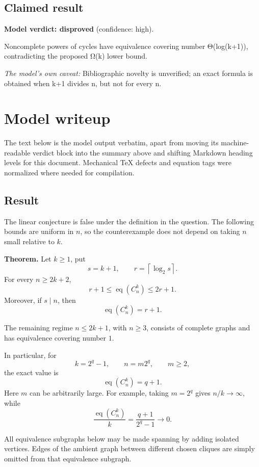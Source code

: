 \documentclass[
  11pt,
  a4paper,
]{article}
\begin{document}
\subsection{Claimed result}\label{claimed-result}

\textbf{Model verdict: disproved} (confidence: high).

Noncomplete powers of cycles have equivalence covering number
Θ(log(k+1)), contradicting the proposed Ω(k) lower bound.

\emph{The model's own caveat:} Bibliographic novelty is unverified; an
exact formula is obtained when k+1 divides n, but not for every n.

\section{Model writeup}\label{model-writeup}

The text below is the model output verbatim, apart from moving its
machine-readable verdict block into the summary above and shifting
Markdown heading levels for this document. Mechanical TeX defects and
equation tags were normalized where needed for compilation.

\subsection{Result}\label{result}

The linear conjecture is false under the definition in the question. The
following bounds are uniform in \(n\), so the counterexample does not
depend on taking \(n\) small relative to \(k\).

\textbf{Theorem.} Let \(k\ge 1\), put \[
s=k+1,\qquad r=\left\lceil\log_2 s\right\rceil.
\] For every \(n\ge 2k+2\), \[
\boxed{\quad r+1\le \operatorname{eq}(C_n^k)\le 2r+1.\quad}
\] Moreover, if \(s\mid n\), then \[
\boxed{\quad \operatorname{eq}(C_n^k)=r+1.\quad}
\]

The remaining regime \(n\le 2k+1\), with \(n\ge3\), consists of complete
graphs and has equivalence covering number \(1\).

In particular, for \[
k=2^q-1,\qquad n=m2^q,\qquad m\ge2,
\] the exact value is \[
\operatorname{eq}(C_n^k)=q+1.
\] Here \(m\) can be arbitrarily large. For example, taking \(m=2^q\)
gives \(n/k\to\infty\), while \[
\frac{\operatorname{eq}(C_n^k)}{k}
=\frac{q+1}{2^q-1}\longrightarrow0.
\]

All equivalence subgraphs below may be made spanning by adding isolated
vertices. Edges of the ambient graph between different chosen cliques
are simply omitted from that equivalence subgraph.
\end{document}
